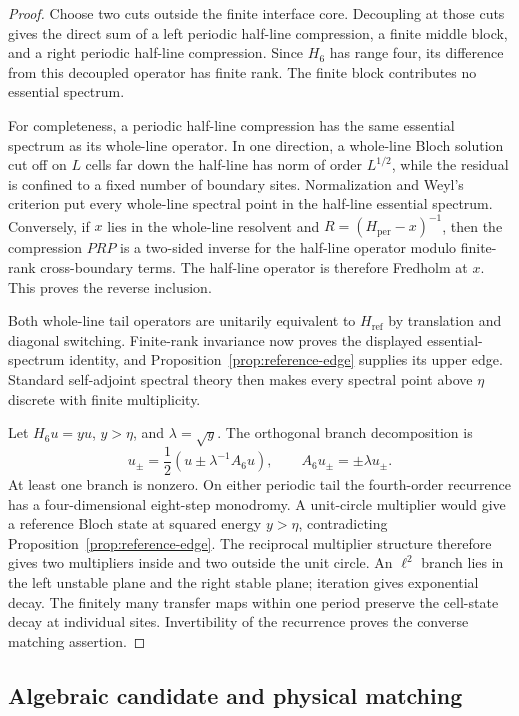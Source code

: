 \begin{proof}
Choose two cuts outside the finite interface core.  Decoupling at those cuts
gives the direct sum of a left periodic half-line compression, a finite
middle block, and a right periodic half-line compression.  Since \(H_6\)
has range four, its difference from this decoupled operator has finite rank.
The finite block contributes no essential spectrum.

For completeness, a periodic half-line compression has the same essential
spectrum as its whole-line operator.  In one direction, a whole-line Bloch
solution cut off on \(L\) cells far down the half-line has norm of order
\(L^{1/2}\), while the residual is confined to a fixed number of boundary
sites.  Normalization and Weyl's criterion put every whole-line spectral
point in the half-line essential spectrum.  Conversely, if \(x\) lies in
the whole-line resolvent and \(R=(H_{\mathrm{per}}-x)^{-1}\), then the
compression \(PRP\) is a two-sided inverse for the half-line operator modulo
finite-rank cross-boundary terms.  The half-line operator is therefore
Fredholm at \(x\).  This proves the reverse inclusion.

Both whole-line tail operators are unitarily equivalent to
\(H_{\mathrm{ref}}\) by translation and diagonal switching.  Finite-rank
invariance now proves the displayed essential-spectrum identity, and
Proposition~\ref{prop:reference-edge} supplies its upper edge.  Standard
self-adjoint spectral theory then makes every spectral point above \(\eta\)
discrete with finite multiplicity.

Let \(H_6u=yu\), \(y>\eta\), and \(\lambda=\sqrt y\).  The orthogonal branch
decomposition is
\[
u_\pm=\frac12\left(u\pm\lambda^{-1}A_6u\right),
\qquad A_6u_\pm=\pm\lambda u_\pm.
\]
At least one branch is nonzero.  On either periodic tail the fourth-order
recurrence has a four-dimensional eight-step monodromy.  A unit-circle
multiplier would give a reference Bloch state at squared energy
\(y>\eta\), contradicting Proposition~\ref{prop:reference-edge}.  The
reciprocal multiplier structure therefore gives two multipliers inside and
two outside the unit circle.  An \(\ell^2\) branch lies in the left unstable
plane and the right stable plane; iteration gives exponential decay.
The finitely many transfer maps within one period preserve the cell-state
decay at individual sites.  Invertibility of the recurrence proves the
converse matching assertion.
\end{proof}

\subsection{Algebraic candidate and physical matching}
\label{subsec:algebraic-candidate-physical-matching}

